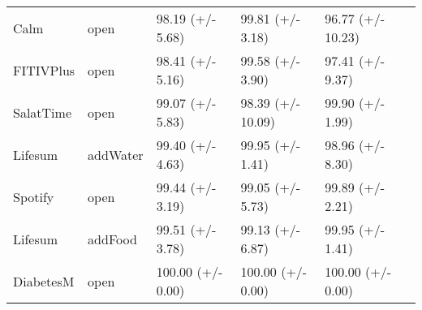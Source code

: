 \begin{table}[ht]
\begin{tabular}{llllll}
Calm & open & 98.19 (+/- 5.68) & 99.81 (+/- 3.18) & 96.77 (+/- 10.23)\\
FITIVPlus & open & 98.41 (+/- 5.16) & 99.58 (+/- 3.90) & 97.41 (+/- 9.37)\\
SalatTime & open & 99.07 (+/- 5.83) & 98.39 (+/- 10.09) & 99.90 (+/- 1.99)\\
Lifesum & addWater & 99.40 (+/- 4.63) & 99.95 (+/- 1.41) & 98.96 (+/- 8.30)\\
Spotify & open & 99.44 (+/- 3.19) & 99.05 (+/- 5.73) & 99.89 (+/- 2.21)\\
Lifesum & addFood & 99.51 (+/- 3.78) & 99.13 (+/- 6.87) & 99.95 (+/- 1.41)\\
DiabetesM & open & 100.00 (+/- 0.00) & 100.00 (+/- 0.00) & 100.00 (+/- 0.00)\\
 
 \bottomrule
\end{tabular}
\end{table}
